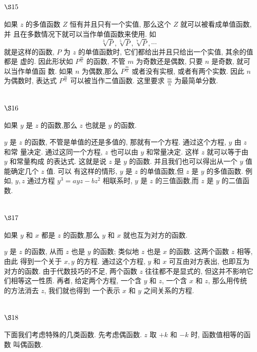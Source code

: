 \section{$\S 15$}

如果 $z$ 的多值函数 $Z$ 恒有并且只有一个实值, 那么这个 $Z$ 就可以被看成单值函数, 并 且在多数情况下就可以当作单值函数来使用. 如
\[
\sqrt[3]{P}, \sqrt[5]{P}, \sqrt[7]{P}, \cdots
\]
就是这样的函数, $P$ 为 $z$ 的单值函数时, 它们都给出并且只给出一个实值, 其余的值都是 虚的. 因此形状如 $P^{\frac{m}{n}}$ 的函数, 不管 $m$ 为奇数还是偶数, 只要 $n$ 是奇数, 就可以当作单值函 数. 如果 $n$ 为偶数,那么 $P^{\frac{m}{n}}$ 或者没有实根, 或者有两个实数. 因此 $n$ 为偶数时, 表达式 $P^{\frac{m}{n}}$ 可以被当作二值函数. 这里要求 $\frac{m}{n}$ 为最简单分数.

\section{$\S 16$}

如果 $y$ 是 $z$ 的函数,那么 $z$ 也就是 $y$ 的函数.

$y$ 是 $z$ 的函数, 不管是单值的还是多值的, 那就有一个方程. 通过这个方程, $y$ 由 $z$ 和常 量决定. 通过这同一个方程, $z$ 也可以由 $y$ 和常量决定. 这样 $z$ 就可以等于由 $y$ 和常量构成 的表达式. 这就是说 $z$ 是 $y$ 的函数. 并且我们也可以得出从一个 $y$ 值能确定几个 $z$ 值. 可以 有这样的情形, $y$ 是 $z$ 的单值函数,但 $z$ 是 $y$ 的多值函数. 例如, $y, z$ 通过方程 $y^{3}=a y z-b z^{2}$ 相联系时, $y$ 是 $z$ 的三值函数,而 $z$ 是 $y$ 的二值函数. 

\section{$\S 17$}

如果 $y$ 和 $x$ 都是 $z$ 的函数,那么 $y$ 和 $x$ 就也互为对方的函数.

$y$ 是 $z$ 的函数, 从而 $z$ 也是 $y$ 的函数; 类似地 $z$ 也是 $x$ 的函数. 这两个函数 $z$ 相等, 由此 得到一个关于 $x, y$ 的方程. 通过这个方程, $y$ 和 $x$ 可互由对方表出, 也即互为对方的函数. 由于代数技巧的不足, 两个函数 $z$ 往往都不是显式的, 但这并不影响它们相等这一性质. 再者, 给定两个方程, 一个含 $y$ 和 $z$, 一个含 $x$ 和 $z$, 那么用传统的方法消去 $z$, 我们就也得到 一个表示 $x$ 和 $y$ 之间关系的方程.

\section{$\S 18$}

下面我们考虑特殊的几类函数. 先考虑偶函数. $z$ 取 $+k$ 和 $-k$ 时, 函数值相等的函数 叫偶函数.

